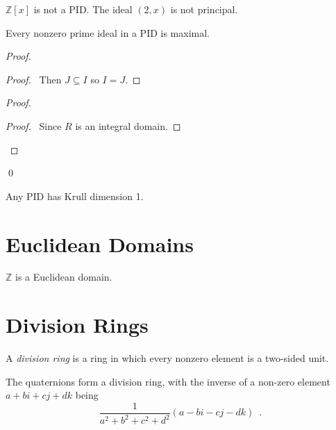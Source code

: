 \begin{ex}
$\mathbb{Z}[x]$ is not a PID. The ideal $(2,x)$ is not principal.
\end{ex}

\begin{prop}
Every nonzero prime ideal in a PID is maximal.
\end{prop}

\begin{proof}
\pf
{}
\begin{proof}
	\pf\ Then $J \subseteq I$ so $I = J$.
\end{proof}
\begin{proof}
	\begin{proof}
		\pf\ Since $R$ is an integral domain.
	\end{proof}
\end{proof}
\qed
\end{proof}

\begin{cor}
Any PID has Krull dimension 1.
\end{cor}

\chapter{Euclidean Domains}


\begin{ex}
$\mathbb{Z}$ is a Euclidean domain.
\end{ex}

\chapter{Division Rings}

\begin{df}
A \emph{division ring} is a ring in which every nonzero element is a two-sided unit.
\end{df}

\begin{ex}
The quaternions form a division ring, with the inverse of a non-zero element $a + bi + cj + dk$ being
\[ \frac{1}{a^2 + b^2 + c^2 + d^2} (a - bi - cj - dk) \enspace . \]
\end{ex}

